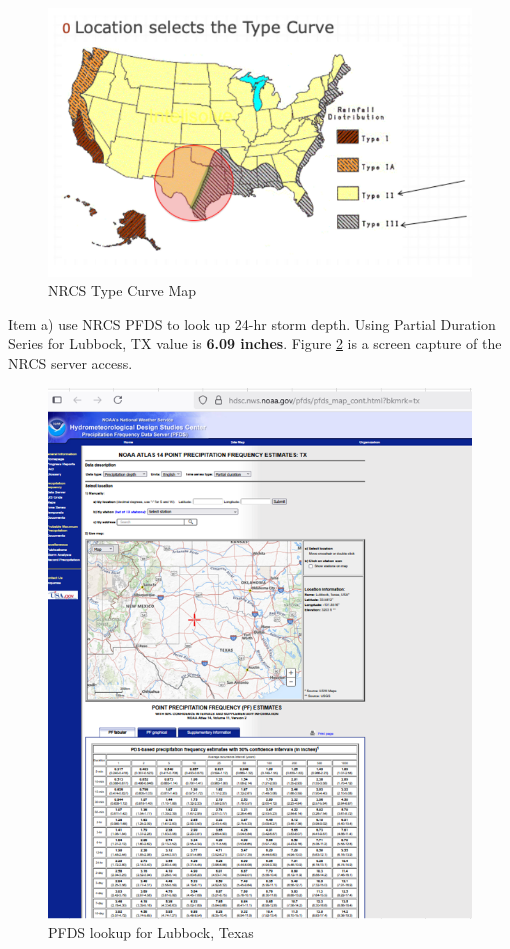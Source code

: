 \documentclass[12pt]{article}
\begin{document}
\begin{enumerate}
\begin{figure}[h!] %
   \centering
   \includegraphics[width=5in]{pr3_map.png} 
   \caption{NRCS Type Curve Map}
   \label{fig:pr3_map}
\end{figure}

\clearpage

Item a) use NRCS PFDS to look up 24-hr storm depth. Using Partial Duration Series for Lubbock, TX value is \textbf{6.09 inches}.  Figure \ref{fig:pr3_pfds} is a screen capture of the NRCS server access.

\begin{figure}[h!] %
   \centering
   \includegraphics[width=5in]{pr3_pfds.png} 
   \caption{PFDS lookup for Lubbock, Texas}
   \label{fig:pr3_pfds}
\end{figure}


\end{enumerate}
\end{document}
